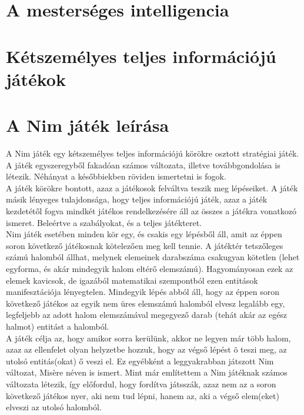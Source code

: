 \label{Chap:tema}

\section {A mesterséges intelligencia}

\section{Kétszemélyes teljes információjú játékok}


\section{A Nim játék leírása}
A Nim játék egy kétszemélyes teljes információjú körökre osztott stratégiai játék. A játék egyszeregyből fakadóan számos változata, illetve továbbgondolása is létezik. Néhányat a későbbiekben röviden ismertetni is fogok. \\

A játék körökre bontott, azaz a játékosok felváltva teszik meg lépéseiket. A játék másik lényeges tulajdonsága, hogy teljes információjú játék, azaz a játék kezdetétől fogva mindkét játékos rendelkezésére áll az összes a játékra vonatkozó ismeret. Beleértve a szabályokat, és a teljes játékteret.\\

Nim játék esetében minden kör egy, és csakis egy lépésből áll, amit az éppen soron következő játékosnak kötelezően meg kell tennie. A játéktér tetszőleges számú halomból állhat, melynek elemeinek darabszáma csakugyan kötetlen (lehet egyforma, és akár mindegyik halom eltérő elemszámú). Hagyományosan ezek az elemek kavicsok, de igazából matematikai szempontból ezen entitások manifesztációja lényegtelen. Mindegyik lépés abból áll, hogy az éppen soron következő játékos az egyik nem üres elemszámú halomból elvesz legalább egy, legfeljebb az adott halom elemszámával megegyező darab (tehát akár az egész halmot) entitást a halomból.\\

A játék célja az, hogy amikor sorra kerülünk, akkor ne legyen már több halom, azaz az ellenfelet olyan helyzetbe hozzuk, hogy az végső lépést õ teszi meg, az utolsó entitás(okat) ő veszi el. Ez egyébként a leggyakrabban játszott Nim változat, Misère néven is ismert. Mint már említettem a Nim játéknak számos változata létezik, így előfordul, hogy fordítva játsszák, azaz nem az a soron következő játékos nyer, aki nem tud lépni, hanem az, aki a végső elem(eket) elveszi az utolsó halomból.\\



